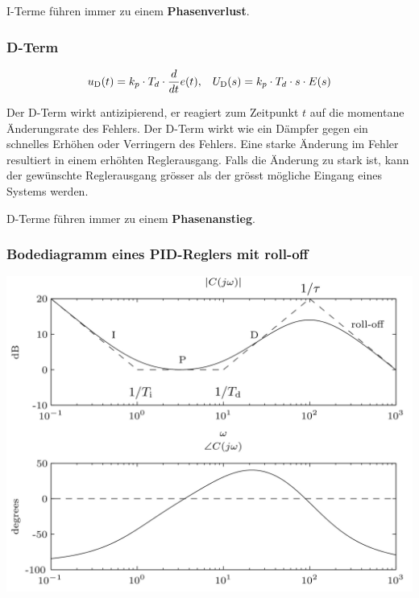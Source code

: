         I-Terme führen immer zu einem \textbf{Phasenverlust}.
        
        \subsubsection{D-Term}
        \[u_\textrm{D}(t) = k_p\cdot T_d \cdot \frac{d}{dt}e(t),\hspace{3mm} U_\textrm{D}(s) = k_p\cdot T_d\cdot s\cdot E(s)\]
        
        Der D-Term wirkt antizipierend, er reagiert zum Zeitpunkt $t$ auf die momentane Änderungsrate des Fehlers. Der D-Term wirkt wie ein Dämpfer gegen ein schnelles Erhöhen oder Verringern des Fehlers. Eine starke Änderung im Fehler resultiert in einem erhöhten Reglerausgang. Falls die Änderung zu stark ist, kann der gewünschte Reglerausgang grösser als der grösst mögliche Eingang eines Systems werden. 
        
        D-Terme führen immer zu einem \textbf{Phasenanstieg}.
        \subsubsection{Bodediagramm eines PID-Reglers mit roll-off}
            \begin{center}
                \includegraphics[width=\linewidth]{images/09/Bodediagramm_roll-off.jpg}
            \end{center}
        
